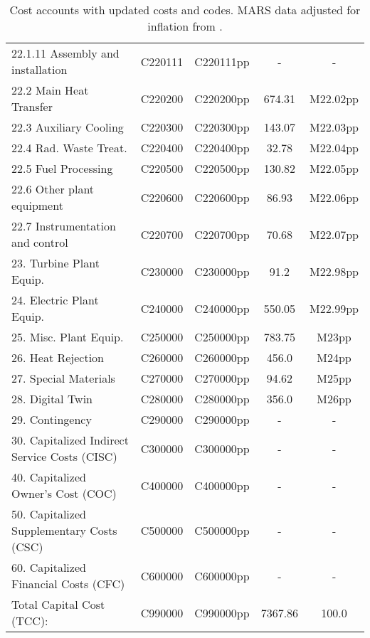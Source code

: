 \begin{table}[h!]
{\begin{tabular}{lcccc}
\hspace{15mm}22.1.11 Assembly and installation & C220111 & C220111pp & - & - \\
\hspace{10mm}22.2 Main Heat Transfer & C220200 & C220200pp & 674.31 & M22.02pp \\
\hspace{10mm}22.3 Auxiliary Cooling & C220300 & C220300pp & 143.07 & M22.03pp \\
\hspace{10mm}22.4 Rad. Waste Treat. & C220400 & C220400pp & 32.78 & M22.04pp \\
\hspace{10mm}22.5 Fuel Processing & C220500 & C220500pp & 130.82 & M22.05pp \\
\hspace{10mm}22.6 Other plant equipment & C220600 & C220600pp & 86.93 & M22.06pp \\
\hspace{10mm}22.7 Instrumentation and control & C220700 & C220700pp & 70.68 & M22.07pp \\
\hspace{5mm}23. Turbine Plant Equip. & C230000 & C230000pp & 91.2 & M22.98pp \\
\hspace{5mm}24. Electric Plant Equip. & C240000 & C240000pp & 550.05 & M22.99pp \\
\hspace{5mm}25. Misc. Plant Equip. & C250000 & C250000pp & 783.75 & M23pp \\
\hspace{5mm}26. Heat Rejection & C260000 & C260000pp & 456.0 & M24pp \\
\hspace{5mm}27. Special Materials & C270000 & C270000pp & 94.62 & M25pp \\
\hspace{5mm}28. Digital Twin & C280000 & C280000pp & 356.0 & M26pp \\
\hspace{5mm}29. Contingency & C290000 & C290000pp & - & - \\
30. Capitalized Indirect Service Costs (CISC) & C300000 & C300000pp & - & - \\
40. Capitalized Owner’s Cost (COC) & C400000 & C400000pp & - & - \\
50. Capitalized Supplementary Costs (CSC) & C500000 & C500000pp & - & - \\
60. Capitalized Financial Costs (CFC) & C600000 & C600000pp & - & - \\
\hline
Total Capital Cost (TCC): & C990000 & C990000pp & 7367.86 & 100.0 \\
\hline
\end{tabular}
}
\caption{Cost accounts with updated costs and codes. MARS data adjusted for inflation from \cite{gordon1986mirror}.}
\label{tab:costs_updated_codes}
\end{table}
